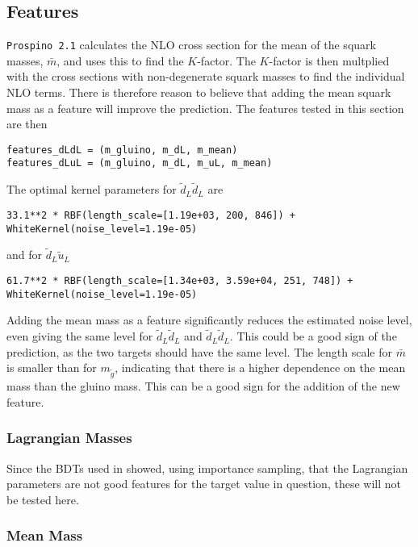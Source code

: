 \documentclass[twoside,english]{uiofysmaster}
\begin{document}
\subsection{Features}

\verb|Prospino 2.1| calculates the NLO cross section for the mean of the squark masses, $\bar{m}$, and uses this to find the $K$-factor. The $K$-factor is then multplied with the cross sections with non-degenerate squark masses to find the individual NLO terms. There is therefore reason to believe that adding the mean squark mass as a feature will improve the prediction. The features tested in this section are then
\begin{lstlisting}
features_dLdL = (m_gluino, m_dL, m_mean)
features_dLuL = (m_gluino, m_dL, m_uL, m_mean)
\end{lstlisting}
The optimal kernel parameters for $\tilde{d}_L \tilde{d}_L$ are
\begin{lstlisting}
33.1**2 * RBF(length_scale=[1.19e+03, 200, 846]) + WhiteKernel(noise_level=1.19e-05)
\end{lstlisting}
and for $\tilde{d}_L \tilde{u}_L$
\begin{lstlisting}
61.7**2 * RBF(length_scale=[1.34e+03, 3.59e+04, 251, 748]) + WhiteKernel(noise_level=1.19e-05)
\end{lstlisting}
Adding the mean mass as a feature significantly reduces the estimated noise level, even giving the same level for $\tilde{d}_L \tilde{d}_L$ and $\tilde{d}_L \tilde{d}_L$. This could be a good sign of the prediction, as the two targets should have the same level. The length scale for $\bar{m}$ is smaller than for $m_{\tilde{g}}$, indicating that there is a higher dependence on the mean mass than the gluino mass. This can be a good sign for the addition of the new feature.

\subsubsection{Lagrangian Masses}

Since the BDTs used in \cite{sparre2018fast} showed, using importance sampling, that the Lagrangian parameters are not good features for the target value in question, these will not be tested here. 


\subsubsection{Mean Mass}


\end{document}
